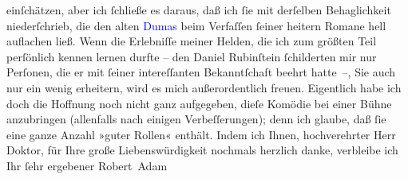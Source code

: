                     einſchätzen, aber ich ſchließe es daraus, daß ich ſie mit derſelben
                    Behaglichkeit niederſchrieb, die den alten \textcolor{blue}{Dumas}{}\ledrightnote{\textcolor{blue}{Alexandre père Dumas}} beim Verfaſſen ſeiner heitern Romane hell auflachen ließ. Wenn
                    die Erlebniſſe meiner Helden, die ich zum größten Teil perſönlich kennen lernen
                    durfte – den Daniel Rubinſtein ſchilderten mir nur Perſonen, die er mit ſeiner
                    intereſſanten Bekanntſchaft beehrt hatte –, Sie auch nur ein wenig erheitern,
                    wird es mich außerordentlich freuen. Eigentlich habe ich doch die Hoffnung noch
                    nicht ganz aufgegeben, dieſe Komödie bei einer Bühne anzubringen (allenfalls
                    nach einigen Verbeſſerungen); denn ich glaube, daß ſie eine ganze Anzahl »guter
                    Rollen« enthält.\pend
           \pstart
           Indem ich Ihnen, hochverehrter Herr Doktor, für Ihre große Liebenswürdigkeit
                    nochmals herzlich danke, verbleibe ich Ihr ſehr ergebener\pend
           \pstart \spacefill\mbox{Robert Adam}\pend{}\endnumbering{}  
      